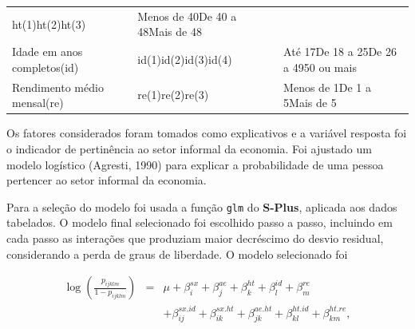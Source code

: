 \documentclass[]{book}
\numberwithin{example}{chapter}
\numberwithin{remark}{chapter}
\numberwithin{definition}{chapter}
\begin{document}
\begin{longtable}[]{@{}lll@{}}
\begin{minipage}[t]{0.10\columnwidth}
ht(1)ht(2)ht(3)\strut
\end{minipage} & \begin{minipage}[t]{0.25\columnwidth}\raggedright\strut
Menos de 40De 40 a 48Mais de 48\strut
\end{minipage}\tabularnewline
\begin{minipage}[t]{0.38\columnwidth}\raggedright\strut
Idade em anos completos(id)\strut
\end{minipage} & \begin{minipage}[t]{0.10\columnwidth}\raggedright\strut
id(1)id(2)id(3)id(4)\strut
\end{minipage} & \begin{minipage}[t]{0.25\columnwidth}\raggedright\strut
Até 17De 18 a 25De 26 a 4950 ou mais\strut
\end{minipage}\tabularnewline
\begin{minipage}[t]{0.38\columnwidth}\raggedright\strut
Rendimento médio mensal(re)\strut
\end{minipage} & \begin{minipage}[t]{0.10\columnwidth}\raggedright\strut
re(1)re(2)re(3)\strut
\end{minipage} & \begin{minipage}[t]{0.25\columnwidth}\raggedright\strut
Menos de 1De 1 a 5Mais de 5\strut
\end{minipage}\tabularnewline
\bottomrule
\end{longtable}

Os fatores considerados foram tomados como explicativos e a variável
resposta foi o indicador de pertinência ao setor informal da economia.
Foi ajustado um modelo logístico (Agresti, 1990) para explicar a
probabilidade de uma pessoa pertencer ao setor informal da economia.

Para a seleção do modelo foi usada a função \texttt{glm} do
\textbf{S-Plus}, aplicada aos dados tabelados. O modelo final
selecionado foi escolhido passo a passo, incluindo em cada passo as
interações que produziam maior decréscimo do desvio residual,
considerando a perda de graus de liberdade. O modelo selecionado foi

\begin{eqnarray}
\log \left( \frac{p_{ijklm}}{1-p_{ijklm}}\right) &=&\mu +\beta
_{i}^{sx}+\beta _{j}^{ae}+\beta _{k}^{ht}+\beta _{l}^{id}+\beta _{m}^{re}
\label{eq:norm28} \\
&&+\beta _{ij}^{sx.id}+\beta _{ik}^{sx.ht}+\beta _{jk}^{ae.ht}+\beta
_{kl}^{ht.id}+\beta _{km}^{ht.re},  \nonumber
\end{eqnarray}
\end{document}
